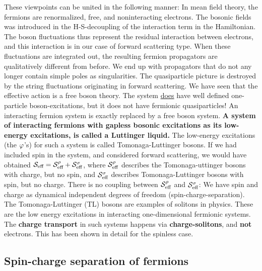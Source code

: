These viewpoints can be united in the following manner:
In mean field theory, the fermions are renormalized, free, and noninteracting electrons. The bosonic fields was introduced in the H-S-decoupling of the interaction term in the Hamiltonian. The boson fluctuations thus represent the residual interaction between electrons, and this interaction is in our case of forward scattering type. When these fluctuations are integrated out, the resulting fermion propagators are qualitatively different from before. We end up with propagators that do not any longer contain simple poles as singularities. The quasiparticle picture is destroyed by the string fluctuations originating in forward scattering.
We have seen that the effective action is a free boson theory. The system \underline{does} have well defined one-particle boson-excitations, but it does not have fermionic quasiparticles! An interacting fermion system is exactly replaced by a free boson system. 
\textbf{A system of interacting fermions with gapless bosonic excitations as its low-energy excitations, is called a Luttinger liquid.}
The low-energy excitations (the $\varphi$'s) for such a system is called Tomonaga-Luttinger bosons. If we had included spin in the system, and considered forward scattering, we would have obtained \(\mathcal{S}_{\text{eff}} = \mathcal{S}_{\text{eff}}^\rho + \mathcal{S}_{\text{eff}}^\sigma\), where \(\mathcal{S}_{\text{eff}}^\rho\) describes the Tomonaga-uttinger bosons with charge, but no spin, and \(\mathcal{S}_{\text{eff}}^\sigma\) describes Tomonaga-Luttinger bosons with spin, but no charge. There is no coupling between \(\mathcal{S}_{\text{eff}}^\rho\) and \(\mathcal{S}_{\text{eff}}^\sigma\): We have spin and charge as dynamical independent degrees of freedom (spin-charge-separation)\cite{lee1988functional}.
The Tomonaga-Luttinger (TL) bosons are examples of solitons in physics. These are the low energy excitations in interacting one-dimensional fermionic systems. The \textbf{charge transport} in such systems happens via \textbf{charge-solitons}, and \textbf{not} electrons. This has been shown in detail for the spinless case.

\subsection{Spin-charge separation of fermions} %

